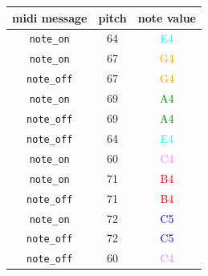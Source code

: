\begin{center}
    \begin{tabular}{ |c|c|c| }
        \hline
        \textbf{midi message} & \textbf{pitch} & \textbf{note value}    \\
        \hline
        \texttt{note\_on}     & 64             & \textcolor{cyan}{E4}   \\
        \texttt{note\_on}     & 67             & \textcolor{orange}{G4} \\
        \texttt{note\_off}    & 67             & \textcolor{orange}{G4} \\
        \texttt{note\_on}     & 69             & \textcolor{Green}{A4}  \\
        \texttt{note\_off}    & 69             & \textcolor{Green}{A4}  \\
        \texttt{note\_off}    & 64             & \textcolor{cyan}{E4}   \\
        \texttt{note\_on}     & 60             & \textcolor{violet}{C4} \\
        \texttt{note\_on}     & 71             & \textcolor{red}{B4}    \\
        \texttt{note\_off}    & 71             & \textcolor{red}{B4}    \\
        \texttt{note\_on}     & 72             & \textcolor{blue}{C5}   \\
        \texttt{note\_off}    & 72             & \textcolor{blue}{C5}   \\
        \texttt{note\_off}    & 60             & \textcolor{violet}{C4} \\
        \hline
    \end{tabular}
\end{center}
